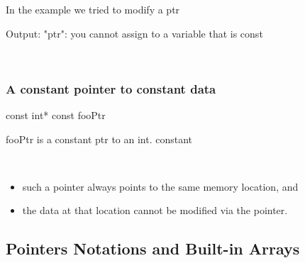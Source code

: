 \noindent In the example we tried to modify a  ptr\\
\begin{minipage}{\MPWxSxLISTING\textwidth} %
    \begin{Terminal}
Output:
"ptr": you cannot assign to a variable that is const
    \end{Terminal}
\end{minipage}\\


\subsubsection{A constant pointer to constant data}
\begin{minipage}{\MPWxXXXSxLISTING\textwidth} %
    \begin{CPPCode}
const int* const fooPtr
    \end{CPPCode}
    \end{minipage}
\begin{minipage}{\MPWxSxLISTING\textwidth} %
    \begin{Terminal}
fooPtr is a constant ptr to an int. constant
    \end{Terminal}
    \end{minipage}\\
    
\begin{itemize}
    \item such a pointer always points to the same memory location, and
    \item the data at that location cannot be modified via the pointer.
\end{itemize}


\subsection{Pointers Notations and Built-in Arrays}
\label{subsec:Pointers-02-ImportantConcepts-Ptrs-and-BuiltInArrays}


